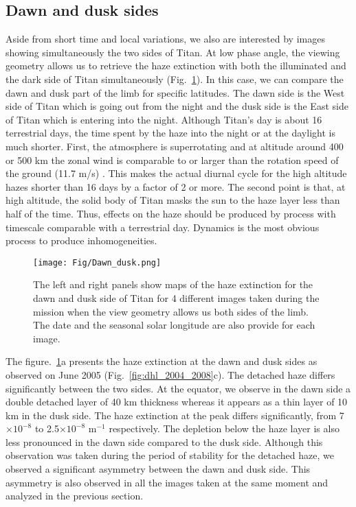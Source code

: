 \subsection{Dawn and dusk sides}

Aside from short time and local variations, we also are interested by images showing simultaneously the two sides
of Titan. At low phase angle, the viewing geometry allows us to retrieve the haze extinction with both the
illuminated and the dark side of Titan simultaneously  (Fig.~\ref{fig:dawn_dusk}).
In this case, we can compare the dawn and dusk part of the limb for
specific latitudes. The dawn side is the West side of Titan which is going out from the night and the
dusk side is the East side of Titan which is entering into the night. Although Titan's day is about 16 terrestrial
days, the time spent by the haze into the night or at the daylight is much shorter.
First, the atmosphere is superrotating and at altitude around 400 or 500 km the zonal wind is comparable to or
larger than the rotation speed of the ground (11.7 m/s) \citep{Flasar2005, Lebonnois2012}.
This makes the actual diurnal cycle for the high altitude hazes shorter than 16 days by a factor of 2 or more.
The second point is that, at high altitude, the solid body of Titan masks the sun to the haze layer less than
half of the time. Thus, effects on the haze should be produced by process with timescale
comparable with a terrestrial day. Dynamics is the most obvious process to produce inhomogeneities.

\begin{figure}[!ht]
    \centering
    \texttt{[image: Fig/Dawn\_dusk.png]}
    \caption{The left and right panels show maps of the haze extinction for the dawn and dusk side of
    Titan for 4 different images taken during the mission when the view geometry allows us both sides
    of the limb. The date and the seasonal solar longitude are also provide for each image.}
    \label{fig:dawn_dusk}
\end{figure}

The figure.~\ref{fig:dawn_dusk}a presents the haze extinction at the dawn and dusk sides as observed
on June 2005 (Fig.~\ref{fig:dhl_2004_2008}c). The detached haze differs significantly between the two sides.
At the equator, we observe in the dawn side a double detached layer of 40 km thickness whereas it appears
as a thin layer of 10 km in the dusk side. The haze extinction at the peak differs significantly,
from 7$\times 10^{-8}$ to 2.5$\times 10^{-8}$ m$^{-1}$ respectively. The depletion below the haze layer
is also less pronounced in the dawn side compared to the dusk side. Although this observation was taken
during the period of stability for the detached haze, we observed a significant asymmetry between
the dawn and dusk side. This asymmetry is also observed in all the images taken at the same moment and
analyzed in the previous section.

